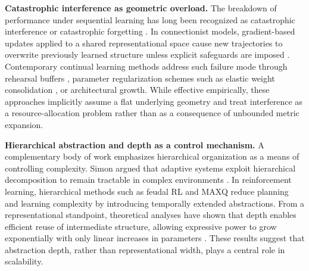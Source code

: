\documentclass{article}
\begin{document}
\noindent\textbf{Catastrophic interference as geometric overload.}
The breakdown of performance under sequential learning has long been recognized as catastrophic interference or catastrophic forgetting \cite{mccloskey1989catastrophic,french1999catastrophic}.
In connectionist models, gradient-based updates applied to a shared representational space cause new trajectories to overwrite previously learned structure unless explicit safeguards are imposed \cite{robins1995catastrophic}.
Contemporary continual learning methods address such failure mode through rehearsal buffers \cite{schaul2015prioritized}, parameter regularization schemes such as elastic weight consolidation \cite{kirkpatrick2017overcoming}, or architectural growth.
While effective empirically, these approaches implicitly assume a flat underlying geometry and treat interference as a resource-allocation problem rather than as a consequence of unbounded metric expansion.
 
\noindent\textbf{Hierarchical abstraction and depth as a control mechanism.}
A complementary body of work emphasizes hierarchical organization as a means of controlling complexity.
Simon argued that adaptive systems exploit hierarchical decomposition to remain tractable in complex environments \cite{simon1973architecture}.
In reinforcement learning, hierarchical methods such as feudal RL \cite{dayan1993feudal} and MAXQ \cite{dietterich2000maxq} reduce planning and learning complexity by introducing temporally extended abstractions.
From a representational standpoint, theoretical analyses have shown that depth enables efficient reuse of intermediate structure, allowing expressive power to grow exponentially with only linear increases in parameters \cite{telgarsky2016benefits}.
These results suggest that abstraction depth, rather than representational width, plays a central role in scalability.
 
\end{document}
